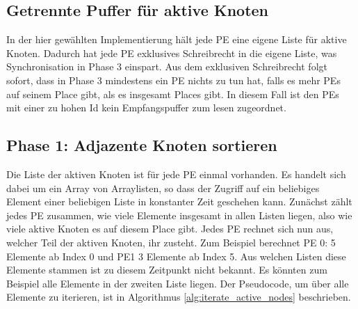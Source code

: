 \subsection{Getrennte Puffer für aktive Knoten} %
\label{sub:getrennte_puffer_f_r_aktive_knoten}
In der hier gewählten Implementierung hält jede PE eine eigene Liste für aktive Knoten. Dadurch hat jede PE exklusives Schreibrecht in die eigene Liste, was Synchronisation in Phase 3 einspart. Aus dem exklusiven Schreibrecht folgt sofort, dass in Phase 3 mindestens ein PE nichts zu tun hat, falls es mehr PEs auf seinem Place gibt, als es insgesamt Places gibt. In diesem Fall ist den PEs mit einer zu hohen Id kein Empfangspuffer zum lesen zugeordnet.

\subsection{Phase 1: Adjazente Knoten sortieren} %
\label{sub:phase_1_invasive}
Die Liste der aktiven Knoten ist für jede PE einmal vorhanden. Es handelt sich dabei um ein Array von Arraylisten, so dass der Zugriff auf ein beliebiges Element einer beliebigen Liste in konstanter Zeit geschehen kann. Zunächst zählt jedes PE zusammen, wie viele Elemente insgesamt in allen Listen liegen, also wie viele aktive Knoten es auf diesem Place gibt. Jedes PE rechnet sich nun aus, welcher Teil der aktiven Knoten, ihr zusteht. Zum Beispiel berechnet PE 0: 5 Elemente ab Index 0 und PE1 3 Elemente ab Index 5. Aus welchen Listen diese Elemente stammen ist zu diesem Zeitpunkt nicht bekannt. Es könnten zum Beispiel alle Elemente in der zweiten Liste liegen. Der Pseudocode, um über alle Elemente zu iterieren, ist in Algorithmus \ref{alg:iterate_active_nodes} beschrieben.

